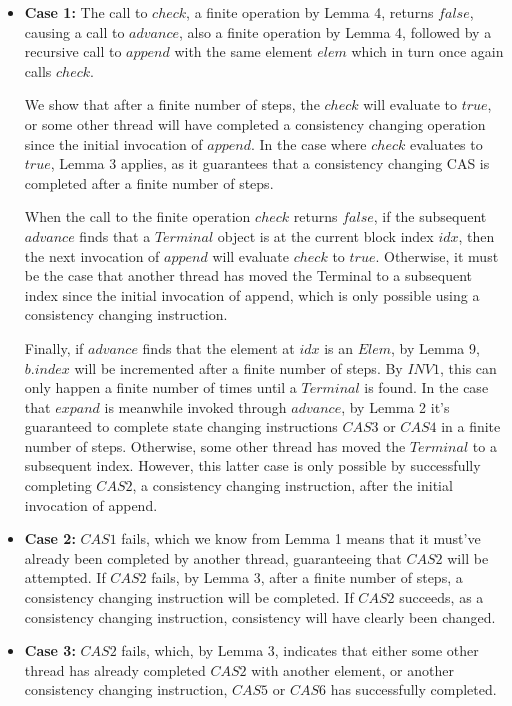 \documentclass[runningheads,a4paper]{llncs}
\begin{document}
\begin{itemize} 

\item \textbf{Case 1:} The call to $check$, a finite operation by Lemma 4,
returns $false$,  causing a call to $advance$, also a finite operation by
Lemma 4, followed by a recursive call to $append$ with the same  element
$elem$ which in turn once again calls $check$.

We show that after a finite number of steps, the $check$ will evaluate to
$true$, or some other thread will have completed a consistency changing
operation since the initial invocation of $append$. In the case where $check$
evaluates to $true$, Lemma 3 applies, as it guarantees that a consistency
changing CAS is completed after a finite number of steps.

When the call to the finite operation $check$ returns $false$, if the
subsequent $advance$ finds that a $Terminal$ object is at the current block
index $idx$, then the next invocation of $append$ will evaluate $check$ to
$true$. Otherwise, it must be the case that another thread has moved the
Terminal to a subsequent index since the initial invocation of append, which
is only possible using a consistency changing instruction.

Finally, if $advance$ finds that the element at $idx$ is an $Elem$, by Lemma
9, $b.index$ will be incremented after a finite number of steps. By $INV1$,
this can only happen a finite number of times until a $Terminal$ is found. In
the case that $expand$ is meanwhile invoked through $advance$, by Lemma 2 it's
guaranteed to complete state changing instructions $CAS3$ or $CAS4$ in a
finite number of steps. Otherwise, some other thread has moved the $Terminal$
to a subsequent index. However, this latter case is only possible by
successfully completing $CAS2$, a consistency changing instruction, after the
initial invocation of append.

\item \textbf{Case 2:} $CAS1$ fails, which we know from Lemma 1 means that it
must've already been completed by another thread, guaranteeing that $CAS2$
will be attempted. If $CAS2$ fails, by Lemma 3, after a finite number of
steps, a consistency changing instruction will be completed. If $CAS2$
succeeds, as a consistency changing instruction, consistency will have
clearly been changed.

\item \textbf{Case 3:} $CAS2$ fails, which, by Lemma 3, indicates that either
some other thread has already completed $CAS2$ with another element, or
another consistency changing instruction, $CAS5$ or $CAS6$ has successfully
completed.  

\end{itemize}
\end{document}
